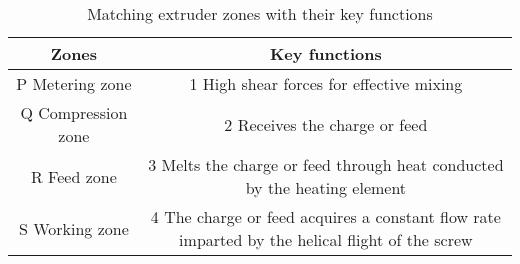 \begin{table}[htbp]
\centering
\caption{Matching extruder zones with their key functions}
\label{tab:tables/table2.tex}
\begin{tabular}{c|c}
\textbf{Zones} & \textbf{Key functions} \\ \hline
P\; Metering zone & 1\; High shear forces for effective mixing \\
Q\; Compression zone & 2\; Receives the charge or feed \\
R\; Feed zone & 3\; Melts the charge or feed through heat conducted by the heating element \\
S\; Working zone & 4\; The charge or feed acquires a constant flow rate imparted by the helical flight of the screw \\
\end{tabular}
\end{table}